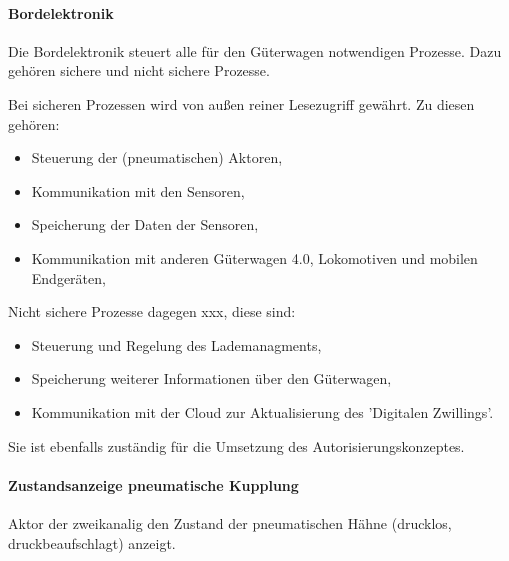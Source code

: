 \paragraph{Bordelektronik}
Die Bordelektronik steuert alle für den Güterwagen notwendigen Prozesse. Dazu gehören sichere und nicht sichere Prozesse.\par
Bei sicheren Prozessen wird von außen reiner Lesezugriff gewährt. Zu diesen gehören:
\begin{itemize}
    \item Steuerung der (pneumatischen) Aktoren,
    \item Kommunikation mit den Sensoren,
    \item Speicherung der Daten der Sensoren,
    \item Kommunikation mit anderen Güterwagen 4.0, Lokomotiven und mobilen Endgeräten,
\end{itemize}
Nicht sichere Prozesse dagegen xxx, diese sind:
\begin{itemize}
    \item Steuerung und Regelung des Lademanagments,
    \item Speicherung weiterer Informationen über den Güterwagen,
    \item Kommunikation mit der Cloud zur Aktualisierung des 'Digitalen Zwillings'.
\end{itemize}
Sie ist ebenfalls zuständig für die Umsetzung des Autorisierungskonzeptes.
\paragraph{Zustandsanzeige pneumatische Kupplung}\label{sec:ZustandKupplung}
Aktor der zweikanalig den Zustand der pneumatischen Hähne (drucklos, druckbeaufschlagt) anzeigt.













